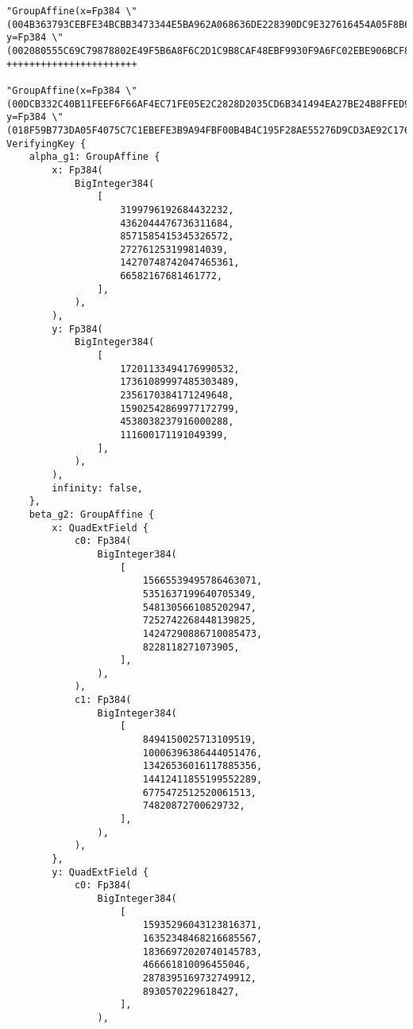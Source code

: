 \documentclass{article}
\begin{document}
\begin{lstlisting}
"GroupAffine(x=Fp384 \"(004B363793CEBFE34BCBB3473344E5BA962A068636DE228390DC9E327616454A05F8B6F3EF601E9212CCEF2977B65BAA)\", y=Fp384 \"(002080555C69C79878802E49F5B6A8F6C2D1C9B8CAF48EBF9930F9A6FC02EBE906BCF8DC2F66BBF7374EF8E0BDB6D93A)\")"
+++++++++++++++++++++++

"GroupAffine(x=Fp384 \"(00DCB332C40B11FEEF6F66AF4EC71FE05E2C2828D2035CD6B341494EA27BE24B8FFED97FBED4F77DF823A871D12BD71D)\", y=Fp384 \"(018F59B773DA05F4075C7C1EBEFE3B9A94FBF00B4B4C195F28AE55276D9CD3AE92C17672E8B10E504387202599F16CB2)\")"
VerifyingKey {
    alpha_g1: GroupAffine {
        x: Fp384(
            BigInteger384(
                [
                    3199796192684432232,
                    4362044476736311684,
                    8571585415345326572,
                    272761253199814039,
                    14270748742047465361,
                    66582167681461772,
                ],
            ),
        ),
        y: Fp384(
            BigInteger384(
                [
                    17201133494176990532,
                    17361089997485303489,
                    2356170384171249648,
                    15902542869977172799,
                    4538038237916000288,
                    111600171191049399,
                ],
            ),
        ),
        infinity: false,
    },
    beta_g2: GroupAffine {
        x: QuadExtField {
            c0: Fp384(
                BigInteger384(
                    [
                        15665539495786463071,
                        5351637199640705349,
                        5481305661085202947,
                        7252742268448139825,
                        14247290886710085473,
                        8228118271073905,
                    ],
                ),
            ),
            c1: Fp384(
                BigInteger384(
                    [
                        8494150025713109519,
                        10006396386444051476,
                        13426536016117885356,
                        14412411855199552289,
                        6775472512520061513,
                        74820872700629732,
                    ],
                ),
            ),
        },
        y: QuadExtField {
            c0: Fp384(
                BigInteger384(
                    [
                        15935296043123816371,
                        16352348468216685567,
                        18366972020740145783,
                        466661810096455046,
                        2878395169732749912,
                        8930570229618427,
                    ],
                ),

\end{lstlisting}
\end{document}
